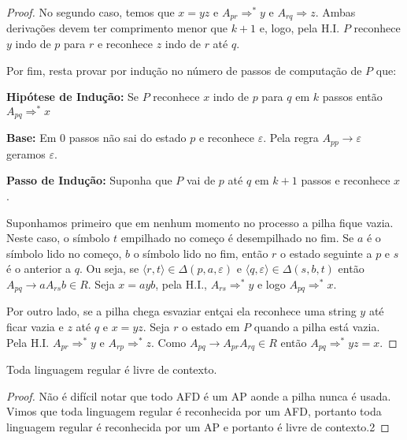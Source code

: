 \begin{proof}
No segundo caso, temos que $x = yz$ e $A_{pr} \Rightarrow^* y$ e $A_{rq} \Rightarrow z$.
Ambas derivações devem ter comprimento menor que $k + 1$ e, logo, pela H.I. $P$ reconhece $y$ indo de $p$ para $r$ e reconhece $z$ indo de $r$ até $q$.

Por fim, resta provar por indução no número de passos de computação de $P$ que:

{\bf Hipótese de Indução:} Se $P$ reconhece $x$ indo de $p$ para $q$ em $k$ passos então $A_{pq} \Rightarrow^* x$

{\bf Base:} Em $0$ passos não sai do estado $p$ e reconhece $\varepsilon$.
Pela regra $A_{pp} \to \varepsilon$ geramos $\varepsilon$.

{\bf Passo de Indução:} Suponha que $P$ vai de $p$ até $q$ em $k+1$ passos e reconhece $x$.

Suponhamos primeiro que em nenhum momento no processo a pilha fique vazia.
Neste caso, o símbolo $t$ empilhado no começo é desempilhado no fim.
Se $a$ é o símbolo lido no começo, $b$ o símbolo lido no fim, então $r$ o estado seguinte a $p$ e $s$ é o anterior a $q$.
Ou seja, se $\langle r,t \rangle \in \Delta(p, a, \varepsilon)$ e $\langle q, \varepsilon \rangle \in \Delta(s, b, t)$ então $A_{pq} \to a A_{rs} b \in R$.
Seja $x = ayb$, pela H.I., $A_{rs} \Rightarrow^* y$ e logo $A_{pq} \Rightarrow^* x$.

Por outro lado, se a pilha chega esvaziar entçai ela reconhece uma string $y$ até ficar vazia e $z$ até $q$ e $x = yz$.
Seja $r$ o estado em $P$ quando a pilha está vazia.
Pela H.I. $A_{pr} \Rightarrow^* y$ e $A_{rp} \Rightarrow^* z$.
Como $A_{pq} \to A_{pr} A_{rq} \in R$ então $A_{pq} \Rightarrow^* yz = x$.
\end{proof}


\begin{corollary}
  Toda linguagem regular é livre de contexto.
\end{corollary}
\begin{proof}
  Não é difícil notar que todo AFD é um AP aonde a pilha nunca é usada.
  Vimos que toda linguagem regular é reconhecida por um AFD, portanto toda linguagem regular é reconhecida por um AP e portanto é livre de contexto.2
\end{proof}


